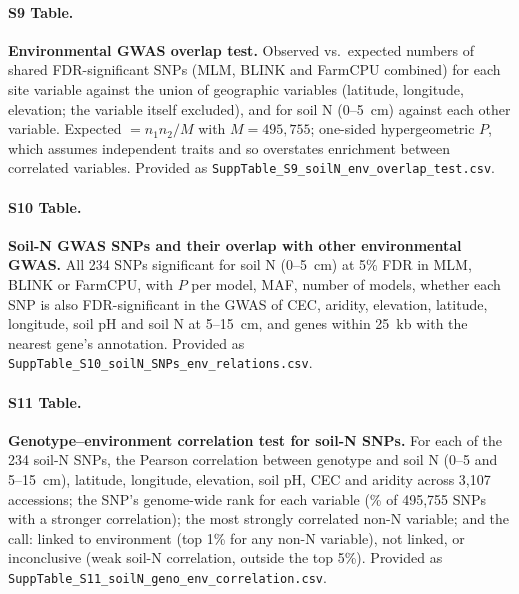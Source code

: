 \paragraph*{S9 Table.}
\makeatletter
\def\@currentlabelname{S9 Table}
\makeatother
\label{S9_Table}
\textbf{Environmental GWAS overlap test.} Observed vs.\ expected numbers of shared FDR-significant SNPs (MLM, BLINK and FarmCPU combined) for each site variable against the union of geographic variables (latitude, longitude, elevation; the variable itself excluded), and for soil N (0--5~cm) against each other variable. Expected $= n_1 n_2 / M$ with $M = 495{,}755$; one-sided hypergeometric $P$, which assumes independent traits and so overstates enrichment between correlated variables. Provided as \texttt{SuppTable\_S9\_soilN\_env\_overlap\_test.csv}.

\paragraph*{S10 Table.}
\makeatletter
\def\@currentlabelname{S10 Table}
\makeatother
\label{S10_Table}
\textbf{Soil-N GWAS SNPs and their overlap with other environmental GWAS.} All 234 SNPs significant for soil N (0--5~cm) at 5\% FDR in MLM, BLINK or FarmCPU, with $P$ per model, MAF, number of models, whether each SNP is also FDR-significant in the GWAS of CEC, aridity, elevation, latitude, longitude, soil pH and soil N at 5--15~cm, and genes within 25~kb with the nearest gene's annotation. Provided as \texttt{SuppTable\_S10\_soilN\_SNPs\_env\_relations.csv}.

\paragraph*{S11 Table.}
\makeatletter
\def\@currentlabelname{S11 Table}
\makeatother
\label{S11_Table}
\textbf{Genotype--environment correlation test for soil-N SNPs.} For each of the 234 soil-N SNPs, the Pearson correlation between genotype and soil N (0--5 and 5--15~cm), latitude, longitude, elevation, soil pH, CEC and aridity across 3,107 accessions; the SNP's genome-wide rank for each variable (\% of 495,755 SNPs with a stronger correlation); the most strongly correlated non-N variable; and the call: linked to environment (top 1\% for any non-N variable), not linked, or inconclusive (weak soil-N correlation, outside the top 5\%). Provided as \texttt{SuppTable\_S11\_soilN\_geno\_env\_correlation.csv}.


